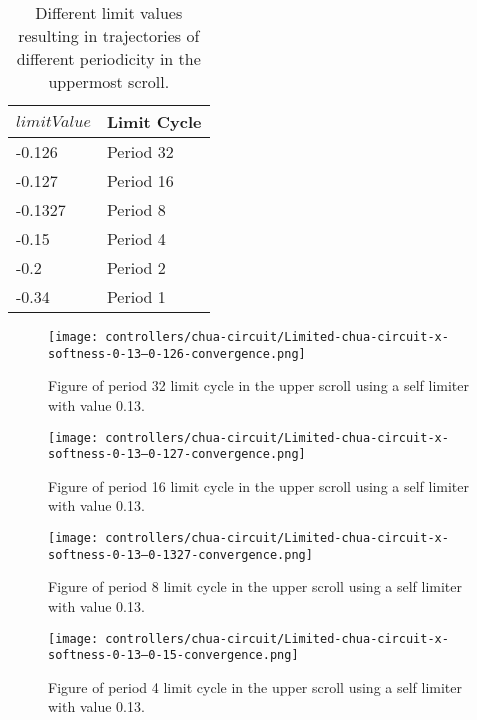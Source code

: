 \documentclass[main]{subfiles}
\begin{document}
\begin{table}[H]
\renewcommand{\arraystretch}{1.2}
\center
\begin{tabular}{@{}ll@{}}
	\toprule
   \(limitValue\) & Limit Cycle\\
   \midrule
   -0.126 & Period 32 \\
   -0.127 & Period 16 \\
   -0.1327 & Period 8 \\ 
   -0.15 & Period 4 \\
   -0.2  & Period 2 \\
   -0.34 & Period 1 \\
   \bottomrule
\end{tabular}
\caption[Limiter values for periodic trajectories for for an x self-limiting limiter with softness 0.13]{Different limit values resulting in trajectories of different periodicity in the uppermost scroll.}
\label{table:x-0.13-periodicities}
\end{table}

\begin{figure}[H]
\centering
\texttt{[image: controllers/chua-circuit/Limited-chua-circuit-x-softness-0-13--0-126-convergence.png]}
\caption[Figure of period 32 limit cycle]{Figure of period 32 limit cycle in the upper scroll using a self limiter with value 0.13.}
\label{figure:x-0.13-32-limit-cycle-upperscroll-trajectory}
\end{figure}

\begin{figure}[H]
\centering
\texttt{[image: controllers/chua-circuit/Limited-chua-circuit-x-softness-0-13--0-127-convergence.png]}
\caption[Figure of period 16 limit cycle]{Figure of period 16 limit cycle in the upper scroll using a self limiter with value 0.13.}
\label{figure:x-0.13-16-limit-cycle-upperscroll-trajectory}
\end{figure}

\begin{figure}[H]
\centering
\texttt{[image: controllers/chua-circuit/Limited-chua-circuit-x-softness-0-13--0-1327-convergence.png]}
\caption[Figure of period 8 limit cycle]{Figure of period 8 limit cycle in the upper scroll using a self limiter with value 0.13.}
\label{figure:x-0.13-8-limit-cycle-upperscroll-trajectory}
\end{figure}

\begin{figure}[H]
\centering
\texttt{[image: controllers/chua-circuit/Limited-chua-circuit-x-softness-0-13--0-15-convergence.png]}
\caption[Figure of period 4 limit cycle]{Figure of period 4 limit cycle in the upper scroll using a self limiter with value 0.13.}
\label{figure:x-0.13-4-limit-cycle-upperscroll-trajectory}
\end{figure}
\end{document}
